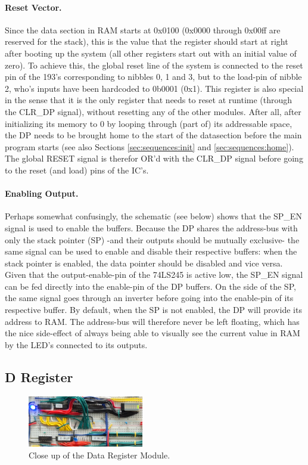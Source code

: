 \paragraph{Reset Vector.} Since the data section in RAM starts at 0x0100 (0x0000 through 0x00ff are reserved for the stack), this is the value that the register should start at right after booting up the system (all other registers start out with an initial value of zero). To achieve this, the global reset line of the system is connected to the reset pin of the 193's corresponding to nibbles 0, 1 and 3, but to the load-pin of nibble 2, who's inputs have been hardcoded to 0b0001 (0x1). This register is also special in the sense that it is the only register that needs to reset at runtime (through the CLR\_DP signal), without resetting any of the other modules. After all, after initializing its memory to 0 by looping through (part of) its addressable space, the DP needs to be brought home to the start of the datasection before the main program starts (see also Sections \ref{sec:sequences:init} and \ref{sec:sequences:home}). The global RESET signal is therefor OR'd with the CLR\_DP signal before going to the reset (and load) pins of the IC's.

\paragraph{Enabling Output.} Perhaps somewhat confusingly, the schematic (see below) shows that the SP\_EN signal is used to enable the buffers. Because the DP shares the address-bus with only the stack pointer (SP) -and their outputs should be mutually exclusive- the same signal can be used to enable and disable their respective buffers: when the stack pointer is enabled, the data pointer should be disabled and vice versa. Given that the output-enable-pin of the 74LS245 is active low, the SP\_EN signal can be fed directly into the enable-pin of the DP buffers. On the side of the SP, the same signal goes through an inverter before going into the enable-pin of its respective buffer. By default, when the SP is not enabled, the DP will provide its address to RAM. The address-bus will therefore never be left floating, which has the nice side-effect of always being able to visually see the current value in RAM by the LED's connected to its outputs. 


\newpage\subsection{D Register}
\begin{figure}[H]
  \centering
  \includegraphics[width=0.45\textwidth]{img/dregistercloseup}
  \caption{Close up of the Data Register Module.}
  \label{fig:dregcloseup}
\end{figure}

